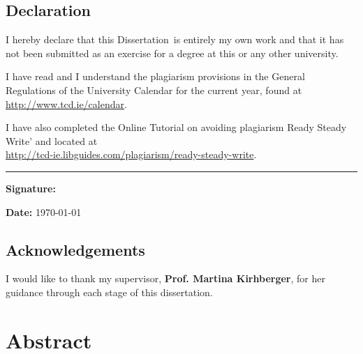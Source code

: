 \documentclass[a4paper,oneside,12pt]{book}
\title{\thesistitle}
\author{\authorname}
\newcommand{\typeofthesis}{Dissertation} %
\begin{document}

\doublespacing

\newpage

\section*{Declaration}
I hereby declare that this \typeofthesis\ is entirely my own work and that it has not been submitted as an exercise for a degree at this or any other university.

I have read and I understand the plagiarism provisions in the General Regulations of the University Calendar for the current year, found at\\
 \url{http://www.tcd.ie/calendar}.

I have also completed the Online Tutorial on avoiding plagiarism Ready Steady Write' and located at \\
 \url{http://tcd-ie.libguides.com/plagiarism/ready-steady-write}.

\vspace{.3cm}
\rule{10cm}{.3pt}

\begin{flushleft}
	\begin{minipage}{\linewidth}
		\textbf{Signature:} 
	\end{minipage}
\end{flushleft}
\textbf{Date: } \today
\vspace{.3cm}

\newpage

\section*{Acknowledgements}
I would like to thank my supervisor, \textbf{Prof. Martina Kirhberger}, for her guidance through each stage of this dissertation.

\chapter{Abstract}


\newpage

\newpage \tableofcontents
\newpage \listoffigures
\newpage \listoftables

\newpage

\vspace{2cm}

\mainmatter











\appendix
\renewcommand{\thechapter}{A\arabic{chapter}}
\end{document}
